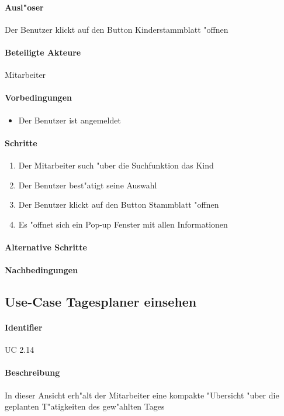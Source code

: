   \paragraph{Ausl"oser}
  Der Benutzer klickt auf den Button \dq Kinderstammblatt "offnen\dq
  \paragraph{Beteiligte Akteure}   \leavevmode \newline
    Mitarbeiter
  \paragraph{Vorbedingungen}
  \begin{itemize}
   \item Der Benutzer ist angemeldet
  \end{itemize}

  \paragraph{Schritte}
  \begin{enumerate}
   \item Der Mitarbeiter such "uber die Suchfunktion das Kind
   \item Der Benutzer best"atigt seine Auswahl
   \item Der Benutzer klickt auf den Button \dq Stammblatt "offnen\dq
   \item Es "offnet sich ein Pop-up Fenster mit allen Informationen
  \end{enumerate}

  \paragraph{Alternative Schritte}
  \paragraph{Nachbedingungen}
  
  \newpage
 \subsection{Use-Case Tagesplaner einsehen}
  \paragraph{Identifier}
  UC 2.14
  \paragraph{Beschreibung}
  In dieser Ansicht erh"alt der Mitarbeiter eine kompakte "Ubersicht "uber die geplanten T"atigkeiten des gew"ahlten Tages
